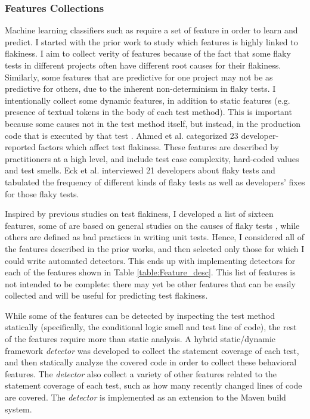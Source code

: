 \subsubsection{Features Collections}
\label{sec:detector}
Machine learning classifiers such as \sysName require a set of feature in order to learn and predict. I started with the prior work \cite{luo2014empirical,eck2019understanding,bell2018deflaker} to study which features is highly linked to flakiness. I aim to collect verity of features because of the fact that some flaky tests in different projects often have different root causes for their flakiness\cite{luo2014empirical}. Similarly, some features that are predictive for one project may not be as predictive for others, due to the inherent non-determinism in flaky tests. 
I intentionally collect some dynamic features, in addition to static features (e.g. presence of textual tokens in the body of each test method). This is important because some causes not in the test method itself, but instead, in the production code that is executed by that test \cite{eck2019understanding}.
Ahmed et al. \cite{ahmad2021empirical} categorized 23 developer-reported factors which affect test flakiness. 
These features are described by practitioners at a high level, and include test case complexity, hard-coded values and test smells.
Eck et al. \cite{eck2019understanding} interviewed 21 developers about flaky tests and tabulated the frequency of different kinds of flaky tests as well as developers' fixes for those flaky tests. 


Inspired by previous studies on test flakiness, I developed a list of sixteen features, 
some of are based on general studies on the causes of flaky tests \cite{luo2014empirical,ahmad2021empirical}, while others are defined as bad practices in writing unit tests.
Hence, I considered all of the features described in the prior works, and then selected only those for which I could write automated detectors.
This ends up with implementing detectors for each of the features shown in Table \ref{table:Feature_desc}. This list of features is not intended to be complete: there may yet be other features that can be easily collected and will be useful for predicting test flakiness.

While some of the features can be detected by inspecting the test method statically (specifically, the conditional logic smell and test line of code), the rest of the features require more than static analysis.
A hybrid static/dynamic framework \emph{detector} was developed to collect the statement coverage of each test, and then statically analyze the covered code in order to collect these behavioral features.
The \emph{detector} also collect a variety of other features related to the statement coverage of each test, such as how many recently changed lines of code are covered.
The \emph{detector} is implemented as an extension to the Maven build system.


